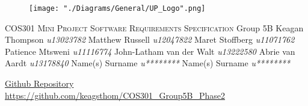 \begin{titlepage}
\begin{center}
\begin{figure}[t]
\centering
\texttt{[image: "./Diagrams/General/UP\_Logo".png]}
\end{figure}
\begin{flushright}
\textsc{\LARGE COS301 Mini Project \newline\newline Software Requirements \newline   Specification}
\newline\newline \Large Group 5B \newline\newline
\large
Keagan Thompson    \emph{u13023782} \newline
Matthew Russell    \emph{u12047822} \newline
Maret Stoffberg    \emph{u11071762} \newline
Patience Mtsweni   \emph{u11116774} \newline
John-Latham van der Walt \emph{u13222580} \newline
Abrie van Aardt    \emph{u13178840} \newline
Name(s) Surname    \emph{u********} \newline
Name(s) Surname    \emph{u********} \newline
\end{flushright}
\vfill
\href{https://github.com/keagsthom/COS301_Group5B_Phase2}{Github Repository}\\
\url{https://github.com/keagsthom/COS301_Group5B_Phase2}
\end{center}
\end{titlepage}



